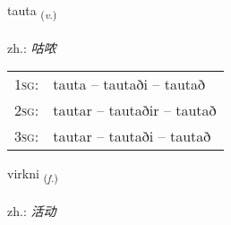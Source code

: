\documentclass[frontgrid, backgrid]{flacards}\usepackage[]{graphicx}\usepackage[]{xcolor}
\begin{document}
\renewcommand{\blhead}{\vskip5pt {\small\bfseries\footnotesize Sagnorð | 动词 }}
\renewcommand{\bcfoot}{\vskip5pt \hspace{2pt}{\small\bfseries\footnotesize 3K}}


{tauta \small{\textsubscript{(\textit{v.})}} \\[1ex] %
\textphonetic{[tʰœiːta]} \\
zh.: \emph{咕哝} \\  [2ex]
\renewcommand*{\arraystretch}{0.8}
\begin{tabular}{p{1cm}l}
\textsc{1sg}: & tauta -- tautaði -- tautað \\ 
\textsc{2sg}: & tautar -- tautaðir -- tautað \\ 
\textsc{3sg}: & tautar -- tautaði -- tautað \\ 
\end{tabular}
}

\renewcommand{\flhead}{\vskip5pt \fboxsep=0pt {\small\bfseries\footnotesize Nafnorð | 名词}}
\renewcommand{\fcfoot}{\vskip5pt \fboxsep=0pt \hspace{2pt}{\small\bfseries\footnotesize 3K}}

\renewcommand{\blhead}{\vskip5pt {\small\bfseries\footnotesize Nafnorð | 名词 }}
\renewcommand{\bcfoot}{\vskip5pt \hspace{2pt}{\small\bfseries\footnotesize 3K}}


{virkni \small{\textsubscript{(\textit{f.})}} \\[1ex] %
 \\
zh.: \emph{活动} \\  [2ex]
\renewcommand*{\arraystretch}{0.8}
}

\renewcommand{\flhead}{\vskip5pt \fboxsep=0pt {\small\bfseries\footnotesize Nafnorð | 名词}}
\renewcommand{\fcfoot}{\vskip5pt \fboxsep=0pt \hspace{2pt}{\small\bfseries\footnotesize 3K}}
\end{document}

